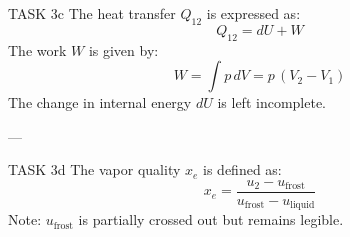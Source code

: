 TASK 3c  
The heat transfer \( Q_{12} \) is expressed as:  
\[
Q_{12} = dU + W
\]  
The work \( W \) is given by:  
\[
W = \int p \, dV = p \, (V_2 - V_1)
\]  
The change in internal energy \( dU \) is left incomplete.

---

TASK 3d  
The vapor quality \( x_e \) is defined as:  
\[
x_e = \frac{u_2 - u_{\text{frost}}}{u_{\text{frost}} - u_{\text{liquid}}}
\]  
Note: \( u_{\text{frost}} \) is partially crossed out but remains legible.